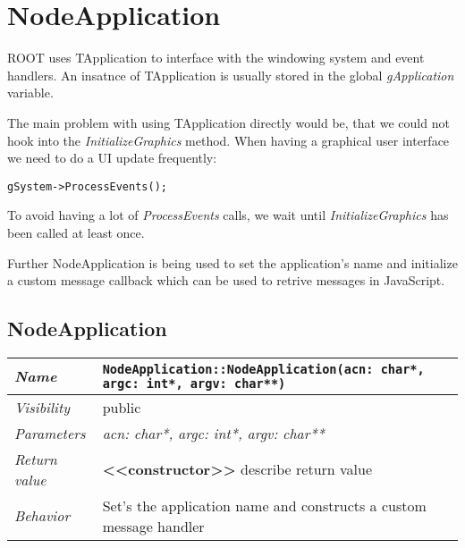 \chapter{NodeApplication}
ROOT uses TApplication to interface with the windowing system and event handlers.
An insatnce of TApplication is usually stored in the global \textit{gApplication} variable.

The main problem with using TApplication directly would be, that we could not hook into the \textit{InitializeGraphics} method.
When having a graphical user interface we need to do a UI update frequently:
\begin{verbatim}
gSystem->ProcessEvents();
\end{verbatim}
To avoid having a lot of \textit{ProcessEvents} calls, we wait until \textit{InitializeGraphics} has been called at least once.

Further NodeApplication is being used to set the application's name and initialize a custom message callback which can be used to retrive messages in JavaScript.

\section{NodeApplication}
\begin{longtable}{p{3cm} @{\hskip 1cm} p{12cm}}
 \hline
\textit{Name} & \texttt{NodeApplication::NodeApplication(acn: char*, argc: int*, argv: char**)}\\
\hline
 \textit{Visibility} & public\\
\hline
\textit{Parameters} & \textit{acn: char*, argc: int*, argv: char**}\\
\hline
\textit{Return value} & \textbf{<<constructor>>} describe return value\\
  \hline
 \textit{Behavior} & Set's the application name and constructs a custom message handler \\
\hline
\end{longtable} \pagebreak
